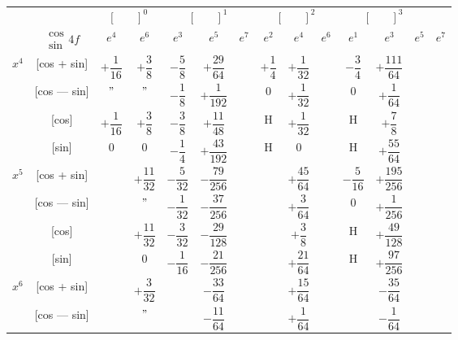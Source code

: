 \documentclass[11pt,a4paper]{book}
\begin{document}
\newpage
{}

\begin{center}
\small
\begin{tabular}{|c|c|c|c|c|c|c|c|c|c|c|c|}
\hline
& &  &  &  &  \\
& $\begin{smallmatrix} \cos \\ \sin \end{smallmatrix} 4f$ & $e^4$ & $e^6$ & $e^3$ & $e^5$ & $e^7$ & $e^2$ & $e^4$ & $e^6$ & $e^1$ & $e^3$ & $e^5$ & $e^7$ \\
\hline
{} & [cos + sin] & $+\dfrac{1}{16}$ & $+\dfrac{3}{8}$ & $-\dfrac{5}{8}$ & $+\dfrac{29}{64}$ & & $+\dfrac{1}{4}$ & $+\dfrac{1}{32}$ & & $-\dfrac{3}{4}$ & $+\dfrac{111}{64}$ \\
& [cos --- sin] & $"$ & $"$ & $-\dfrac{1}{8}$ & $+\dfrac{1}{192}$ & & $0$ & $+\dfrac{1}{32}$ & & $0$ & $+\dfrac{1}{64}$ \\
& [cos] & $+\dfrac{1}{16}$ & $+\dfrac{3}{8}$ & $-\dfrac{3}{8}$ & $+\dfrac{11}{48}$ & & H & $+\dfrac{1}{32}$ & & H & $+\dfrac{7}{8}$ \\
& [sin] & $0$ & $0$ & $-\dfrac{1}{4}$ & $+\dfrac{43}{192}$ & & H & $0$ & & H & $+\dfrac{55}{64}$ \\
\hline
{} & [cos + sin] & & $+\dfrac{11}{32}$ & $-\dfrac{5}{32}$ & $-\dfrac{79}{256}$ & & & $+\dfrac{45}{64}$ & & $-\dfrac{5}{16}$ & $+\dfrac{195}{256}$ \\
& [cos --- sin] & & $"$ & $-\dfrac{1}{32}$ & $-\dfrac{37}{256}$ & & & $+\dfrac{3}{64}$ & & $0$ & $+\dfrac{1}{256}$ \\
& [cos] & & $+\dfrac{11}{32}$ & $-\dfrac{3}{32}$ & $-\dfrac{29}{128}$ & & & $+\dfrac{3}{8}$ & & H & $+\dfrac{49}{128}$ \\
& [sin] & & $0$ & $-\dfrac{1}{16}$ & $-\dfrac{21}{256}$ & & & $+\dfrac{21}{64}$ & & H & $+\dfrac{97}{256}$ \\
\hline
{} & [cos + sin] & & $+\dfrac{3}{32}$ & & $-\dfrac{33}{64}$ & & & $+\dfrac{15}{64}$ & & & $-\dfrac{35}{64}$ \\
& [cos --- sin] & & $"$ & & $-\dfrac{11}{64}$ & & & $+\dfrac{1}{64}$ & & & $-\dfrac{1}{64}$ \\

\end{tabular}
\end{center}
\end{document}
